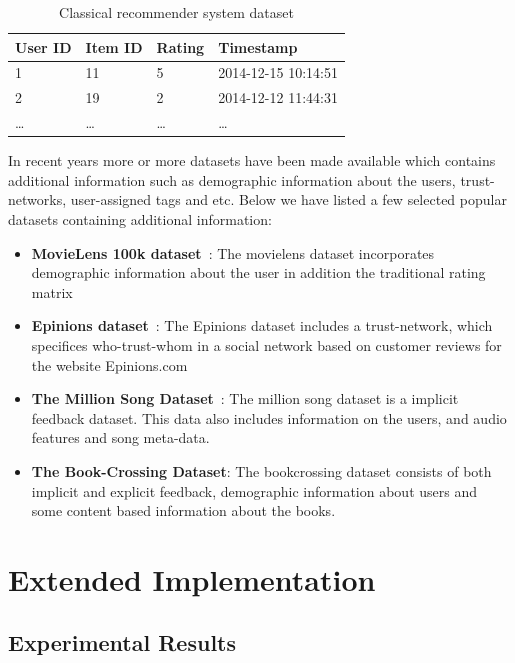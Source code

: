 \begin{table}[H]
\centering
	\begin{tabular}{*{4}l}
	\toprule
		User ID & Item ID & Rating & Timestamp \\ \midrule
		1		  &	11	  &	5	    &  2014-12-15 10:14:51  \\
		2		  &	19	  &	2	    &  2014-12-12 11:44:31  \\
		\dots &	\dots &	\dots &  \dots                \\
	\bottomrule
	\end{tabular}
\caption{Classical recommender system dataset}
\end{table}

In recent years more or more datasets have been made available which contains
additional information such as demographic information about the users,
trust-networks, user-assigned tags and etc. Below we have listed a few selected
popular datasets containing additional information:

\begin{itemize}

\item \textbf{MovieLens 100k dataset}~\cite{Movielens}: The movielens dataset
	incorporates demographic information about the user in addition the
	traditional rating matrix

\item \textbf{Epinions dataset}~\cite{Epinions}: The Epinions dataset includes a
	trust-network, which specifices who-trust-whom in a social network based on
	customer reviews for the website Epinions.com

\item \textbf{The Million Song Dataset}~\cite{Bertin-Mahieux2011}: The million song
	dataset is a implicit feedback dataset. This data also includes information on the users,
	and audio features and song meta-data.

\item \textbf{The Book-Crossing Dataset}: The bookcrossing dataset consists of both implicit and explicit feedback,
	demographic information about users and some content based information about the books.
\end{itemize}

\chapter{Extended Implementation}
\label{app:impl}

\section{Experimental Results}
\label{app:results}

